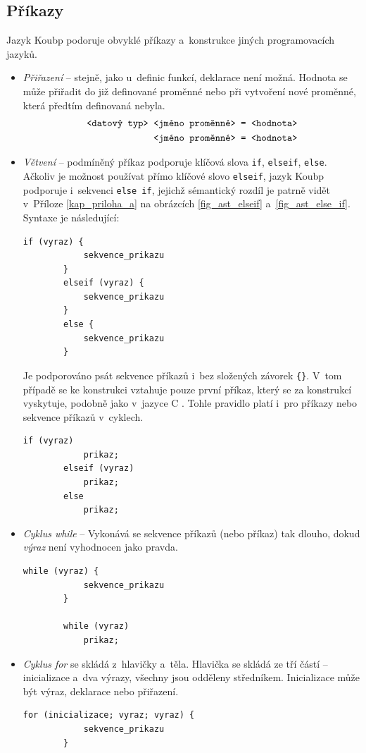 \subsection*{Příkazy}
Jazyk Koubp podoruje obvyklé příkazy a~konstrukce jiných programovacích jazyků.
\begin{itemize}
    \item \emph{Přiřazení} -- stejně, jako u~definic funkcí, deklarace není možná.
    Hodnota se může přiřadit do již definované proměnné nebo při vytvoření nové proměnné, která předtím definovaná nebyla.
    \begin{align*}
        \text{\texttt{<datový typ> <jméno proměnné> }} &\text{\texttt{= <hodnota>}} \\
        \text{\texttt{<jméno proměnné> }} &\text{\texttt{= <hodnota>}}        
    \end{align*}
    \item \emph{Větvení} -- podmíněný příkaz podporuje klíčová slova \texttt{if}, \texttt{elseif}, \texttt{else}.
    Ačkoliv je možnost používat přímo klíčové slovo \texttt{elseif}, jazyk Koubp podporuje i~sekvenci \texttt{else if}, jejichž sémantický rozdíl je patrně vidět v~Příloze \ref{kap_priloha_a} na obrázcích \ref{fig_ast_elseif} a~\ref{fig_ast_else_if}.
    Syntaxe je následující:
    \begin{lstlisting}[language=Koubp]
        if (vyraz) {
            sekvence_prikazu
        }
        elseif (vyraz) {
            sekvence_prikazu
        }
        else {
            sekvence_prikazu
        }
    \end{lstlisting}
    Je podporováno psát sekvence příkazů i~bez složených závorek \texttt{\{\}}.
    V~tom případě se ke konstrukci vztahuje pouze první příkaz, který se za konstrukcí vyskytuje, podobně jako v~jazyce C \cite{ISO-C-Standard}.
    Tohle pravidlo platí i~pro příkazy nebo sekvence příkazů v~cyklech. 
    \begin{lstlisting}[language=Koubp]
        if (vyraz) 
            prikaz;
        elseif (vyraz)
            prikaz;
        else
            prikaz;
    \end{lstlisting}

    \item \emph{Cyklus while} -- Vykonává se sekvence příkazů (nebo příkaz) tak dlouho, dokud \emph{výraz} není vyhodnocen jako pravda.
    \begin{lstlisting}[language=Koubp]
        while (vyraz) {
            sekvence_prikazu
        }

        while (vyraz)
            prikaz;
    \end{lstlisting}
    \item \emph{Cyklus for} se skládá z~hlavičky a~těla.
    Hlavička se skládá ze tří částí -- inicializace a~dva výrazy, všechny jsou odděleny středníkem.
    Inicializace může být výraz, deklarace nebo přiřazení.
    \begin{lstlisting}[language=Koubp]
        for (inicializace; vyraz; vyraz) {
            sekvence_prikazu
        }


\end{lstlisting}
\end{itemize}

